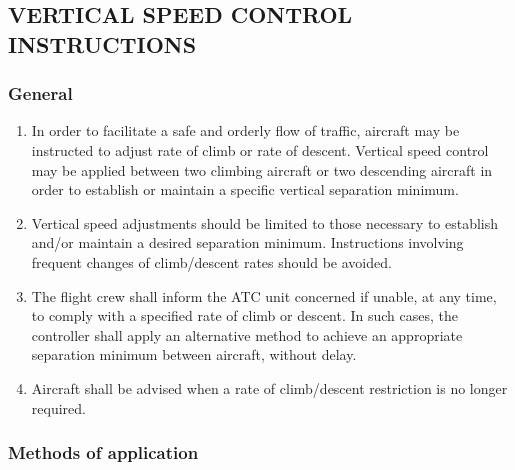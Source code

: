 \documentclass[../vATM.tex]{subfiles}
\begin{document}
    \subsection[Vertical speed control instructions]{VERTICAL SPEED CONTROL INSTRUCTIONS}

    \subsubsection{General}

    \begin{enumerate}
        \item In order to facilitate a safe and orderly flow of traffic, aircraft may be instructed to adjust rate of climb or rate of descent. Vertical speed control may be applied between two climbing aircraft or two descending aircraft in order to establish or maintain a specific vertical separation minimum.
        \item Vertical speed adjustments should be limited to those necessary to establish and/or maintain a desired separation minimum. Instructions involving frequent changes of climb/descent rates should be avoided.
        \item The flight crew shall inform the ATC unit concerned if unable, at any time, to comply with a specified rate of climb or descent. In such cases, the controller shall apply an alternative method to achieve an appropriate separation minimum between aircraft, without delay.
        \item Aircraft shall be advised when a rate of climb/descent restriction is no longer required.
    \end{enumerate}

    \subsubsection{Methods of application}
\end{document}
